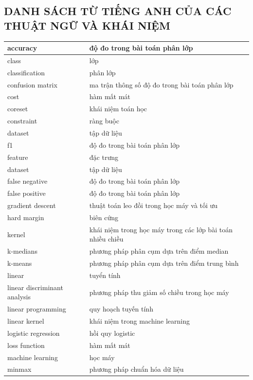 \documentclass[a4paper, 12pt, oneside]{report}
\begin{document}
\newpage
\begin{titlepage}
\section*{DANH SÁCH TỪ TIẾNG ANH CỦA CÁC THUẬT NGỮ VÀ KHÁI NIỆM} 
\bigskip
\bigskip
\begin{longtable}[htp]{|l|l|}
\hline
accuracy & độ đo trong bài toán phân lớp\\
\hline
class & lớp\\
\hline
classification & phân lớp\\
\hline
confusion matrix & ma trận thông số độ đo trong bài toán phân lớp\\
\hline
cost & hàm mất mát\\
\hline 
coreset & khái niệm toán học\\ 
\hline 
constraint & ràng buộc\\
\hline
dataset & tập dữ liệu\\
\hline
f1 & độ đo trong bài toán phân lớp\\
\hline
feature & đặc trưng\\
\hline
dataset & tập dữ liệu\\
\hline
false negative & độ đo trong bài toán phân lớp\\
\hline
false positive & độ đo trong bài toán phân lớp\\
\hline
gradient descent & thuật toán leo đồi trong học máy và tối ưu\\
\hline
hard margin & biên cứng\\
\hline
kernel & khái niệm trong học máy trong các lớp bài toán nhiều chiều\\
\hline
k-medians & phương pháp phân cụm dựa trên điểm median\\
\hline
k-means & phương pháp phân cụm dựa trên điểm trung bình\\
\hline
linear & tuyển tính\\
\hline
linear discriminant analysis & phương pháp thu giảm số chiều trong học máy \\
\hline 
linear programming & quy hoạch tuyến tính\\
\hline 
linear kernel & khái niệm trong machine learning\\
\hline
logistic regression & hồi quy logistic\\
\hline
loss function & hàm mất mát\\
\hline
machine learning & học máy\\
\hline
minmax & phương pháp chuẩn hóa dữ liệu\\

\end{longtable}
\end{titlepage}
\end{document}
